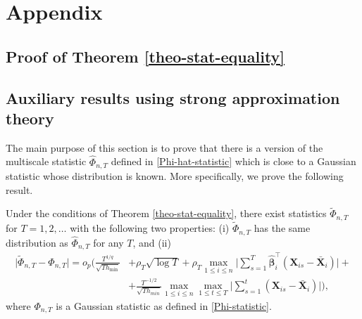 \section{Appendix}\label{sec-appendix}

\subsection{Proof of Theorem \ref{theo-stat-equality}}\label{subsec-appendix-stat-equaility}

\subsection*{Auxiliary results using strong approximation theory}


The main purpose of this section is to prove that there is a version of the multiscale statistic $\widehat{\Phi}_{n,T}$ defined in \eqref{Phi-hat-statistic} which is close to a Gaussian statistic whose distribution is known. More specifically, we prove the following result. 
\begin{propA}\label{propA-strong-approx-equality}
Under the conditions of Theorem \ref{theo-stat-equality}, there exist statistics $\widetilde{\Phi}_{n,T}$ for $T = 1,2,\ldots$ with the following two properties: (i) $\widetilde{\Phi}_{n, T}$ has the same distribution as $\widehat{\Phi}_{n, T}$ for any $T$, and (ii)
\begin{align*}
\big| \widetilde{\Phi}_{n, T} - \Phi_{n,T} \big| = o_p \Big( \frac{T^{1/q}}{\sqrt{T h_{\min}}} &+ \rho_T \sqrt{\log T} + \rho_T\max_{1\le i\le n} \Big|\sum\limits_{s=1}^T \widehat{\bm{\beta}}_i^\top(\mathbf{X}_{is} - \bar{\mathbf{X}}_{i} )\Big| +\\
&+ \frac{T^{-1/2}}{\sqrt{Th_{min}}} \max_{1 \le i \le n}\max_{1\le t \le T}\Big|\sum\limits_{s=1}^t (\mathbf{X}_{is} - \bar{\mathbf{X}}_{i} )\Big|  \Big),
\end{align*}
where $\Phi_{n,T}$ is a Gaussian statistic as defined in \eqref{Phi-statistic}. 
\end{propA}
